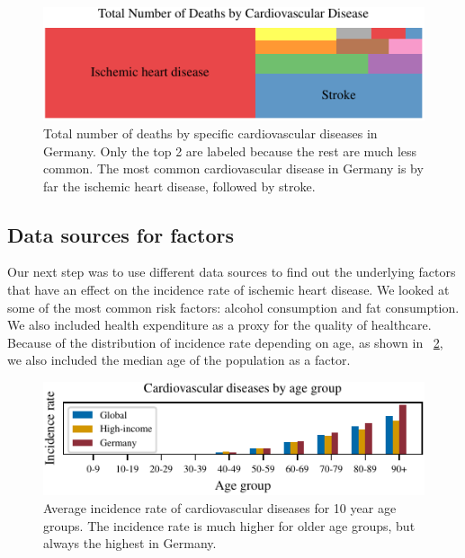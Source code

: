 \begin{figure}[ht]
    \vskip 0.2in
    \begin{center}
    \centerline{\includegraphics[width=\columnwidth]{fig/CVD_germany.pdf}}
    \caption{Total number of deaths by specific cardiovascular diseases in Germany. Only the top 2 are labeled because the rest are much less common. 
    The most common cardiovascular disease in Germany is by far the ischemic heart disease, followed by stroke.}
    \label{specific_cardiovascular_diseases}
    \end{center}
    \vskip -0.2in
\end{figure}

\subsection{Data sources for factors}\label{sec:data_sources}
Our next step was to use different data sources to find out the underlying factors that have an effect on the incidence rate of ischemic heart disease. We looked at some of 
the most common risk factors: alcohol consumption and fat consumption. We also included health expenditure as a proxy for the quality of healthcare. Because of the 
distribution of incidence rate depending on age, as shown in \figurename~\ref{Cardiovascular diseases for age groups}, we also included the median age of the population as a 
factor.

\begin{figure}[ht]
\vskip 0.2in
\begin{center}
\centerline{\includegraphics[width=\columnwidth]{fig/fig_cardiovascular_disease_agerange.pdf}}
\caption{Average incidence rate of cardiovascular diseases for 10 year age groups. The incidence rate is much higher for older age groups, but 
always the highest in Germany.}
\label{Cardiovascular diseases for age groups}
\end{center}
\vskip -0.2in
\end{figure}

